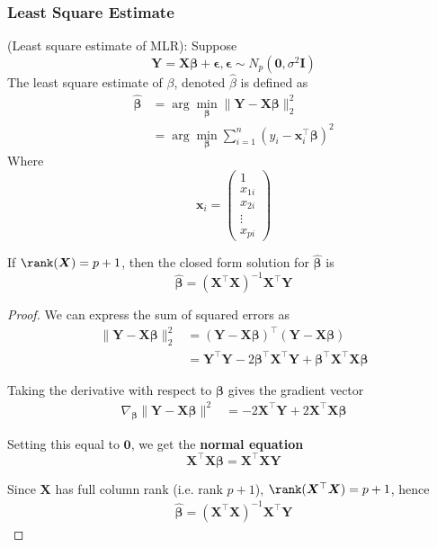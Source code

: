 \subsubsection{Least Square Estimate}
\begin{definition}
    (Least square estimate of MLR): Suppose 
    \[
    \bm{Y} = \bm{X \beta} + \bm{\epsilon}, \bm{\epsilon} \sim N_p \left( \bm{0}, \sigma^2 \bm{I} \right) 
    \]
    The least square estimate of $\beta$, denoted $\hat{\beta}$ is defined as 
    \begin{align*}
        \hat{\bm{\beta}} &= \arg \min_{\bm{\beta}} \lVert \bm{Y} - \bm{X \beta} \rVert_2^2 \\
        &= \arg \min_{ \bm{\beta}} \sum\limits_{i = 1}^{n}  \left( y_i - \bm{x}_i^{\top} \bm{\beta} \right)^2
    \end{align*}
    Where 
    \[
        \bm{x}_i = \begin{pmatrix} 
          1 \\ x_{1i}   \\ x_{2i} \\ \vdots \\ x_{pi}
        \end{pmatrix}
    \]
\end{definition}

\begin{result}
    If $\rank(\bm{X}) = p + 1$, then the closed form solution for $ \hat{ \bm{\beta}}$ is 
    \[
        \hat{ \bm{\beta}} = \left( \bm{X}^{\top} \bm{X} \right)^{-1} \bm{X}^{\top} \bm{Y}
    \]
\end{result}

\begin{proof}
    We can express the sum of squared errors as 
    \begin{align*}
        \lVert \bm{Y} - \bm{X \beta} \rVert_2^2 &= \left( \bm{Y} - \bm{X \beta} \right)^{\top} \left( \bm{Y} - \bm{X \beta} \right)  \\
        &= \bm{Y}^{\top} \bm{Y} - 2 \bm{\beta}^{\top}\bm{X}^{\top}\bm{Y} + \bm{\beta}^{\top}\bm{X}^{\top}\bm{X}\bm{\beta}
    \end{align*}

    Taking the derivative with respect to $\bm{\beta}$ gives the gradient vector 
    \begin{align*}
        \nabla_{ \bm{\beta}} \lVert \bm{Y} - \bm{X \beta} \rVert^2 &= -2 \bm{X}^{\top} \bm{Y} + 2 \bm{X}^{\top} \bm{X} \bm{\beta}
    \end{align*}

    Setting this equal to $\bm{0}$, we get the \textbf{normal equation} 
    \[
        \bm{X}^{\top} \bm{X \beta} = \bm{X}^{\top} \bm{XY}
    \]

    Since $\bm{X}$ has full column rank (i.e. rank $p + 1$), $\rank(\bm{X}^{\top}\bm{X}) = p + 1$, hence 
    \begin{align*}
        \hat{ \bm{ \beta}} = \left( \bm{X}^{\top} \bm{X} \right)^{-1} \bm{X}^{\top}\bm{Y}
    \end{align*}
\end{proof}


